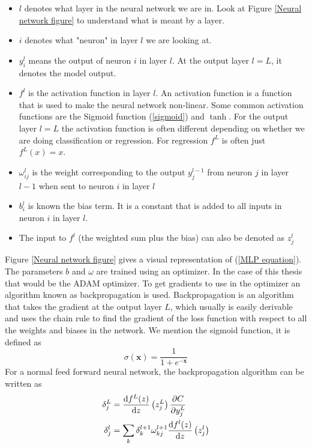 \begin{itemize}
    \item $l$ denotes what layer in the neural network we are in. Look at Figure 
    \ref{Neural network figure} to understand what is meant by a layer.
    \item $i$ denotes what "neuron" in layer $l$ we are looking at. 
    \item $y_i^l$ means the output of neuron $i$ in layer $l$. At the output layer $l=L$, it denotes the model output.
    \item $f^l$ is the activation function in layer $l$. An activation function is a function that is used to make the neural network non-linear. Some common activation functions are the Sigmoid function (\ref{sigmoid}) and $\tanh$. For the output layer $l=L$ the activation function is often different depending on whether we are doing classification or regression. For regression $f^L$ is often just $f^L(x)=x$.
    \item $\omega_{ij}^l$ is the weight corresponding to the output $y_j^{l-1}$ from neuron $j$ in layer $l-1$ when sent to neuron $i$ in layer $l$
    \item $b_i^l$ is known the bias term. It is a constant that is added to all inputs in neuron $i$ in layer $l$.
    \item The input to $f^l$ (the weighted sum plus the bias) can also be denoted as $z^l_j$
\end{itemize}
Figure \ref{Neural network figure} gives a visual representation of (\ref{MLP equation}).
The parameters $b$ and $\omega$ are trained using an optimizer. In the case of this 
thesis that would be the ADAM optimizer. To get gradients to use in the optimizer 
an algorithm known as backpropagation is used. Backpropagation is an algorithm that 
takes the gradient at the output layer $L$, which usually is easily derivable and 
uses the chain rule to find the gradient of the loss function with respect to all 
the weights and biases in the network.
We mention the sigmoid function, it is defined as
\begin{equation}
	\sigma(\bm{x}) = \frac{1}{1 + e^{-\bm{x}}} \label{sigmoid}
\end{equation}
For a normal feed forward neural network, the backpropagation algorithm can be written 
as 
\begin{align}
    \delta^L_j &= \dv{f^L(z)}{z}\left(z^L_j\right) \pdv{C}{y^L_j} \label{output_backprop}\\
    \delta^l_j &= \sum_k \delta^{l+1}_k \omega^{l+1}_{kj} \dv{f^l(z)}{z}\left(z^l_j\right)  \label{backprop}
\end{align}
